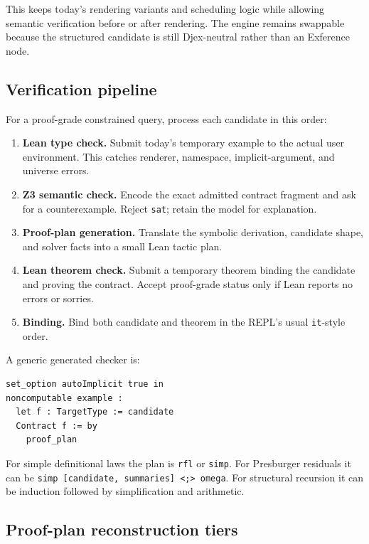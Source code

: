\documentclass[11pt,oneside]{article}
\newcommand{\code}[1]{\texttt{#1}}
\begin{document}
This keeps today's rendering variants and scheduling logic while allowing semantic
verification before or after rendering. The engine remains swappable because the
structured candidate is still Djex-neutral rather than an Exference node.

\subsection{Verification pipeline}

For a proof-grade constrained query, process each candidate in this order:

\begin{enumerate}
  \item \textbf{Lean type check.} Submit today's temporary example to the actual user
        environment. This catches renderer, namespace, implicit-argument, and universe
        errors.
  \item \textbf{Z3 semantic check.} Encode the exact admitted contract fragment and ask
        for a counterexample. Reject \code{sat}; retain the model for explanation.
  \item \textbf{Proof-plan generation.} Translate the symbolic derivation, candidate
        shape, and solver facts into a small Lean tactic plan.
  \item \textbf{Lean theorem check.} Submit a temporary theorem binding the candidate
        and proving the contract. Accept proof-grade status only if Lean reports no
        errors or sorries.
  \item \textbf{Binding.} Bind both candidate and theorem in the REPL's usual
        \code{it}-style order.
\end{enumerate}

A generic generated checker is:

\begin{lstlisting}[language=Lean,caption={Final Leant behavioral checker shape}]
set_option autoImplicit true in
noncomputable example :
  let f : TargetType := candidate
  Contract f := by
    proof_plan
\end{lstlisting}

For simple definitional laws the plan is \code{rfl} or \code{simp}. For Presburger
residuals it can be \code{simp [candidate, summaries] <;> omega}. For structural
recursion it can be induction followed by simplification and arithmetic.

\subsection{Proof-plan reconstruction tiers}
\end{document}
